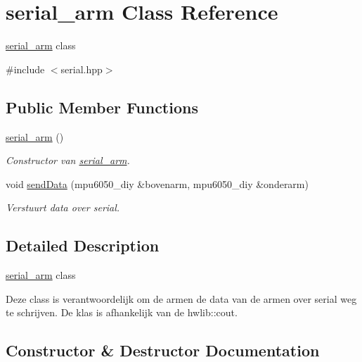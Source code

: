 \hypertarget{classserial__arm}{}\section{serial\+\_\+arm Class Reference}
\label{classserial__arm}


\hyperlink{classserial__arm}{serial\+\_\+arm} class  




{\ttfamily \#include $<$serial.\+hpp$>$}

\subsection*{Public Member Functions}
\begin{DoxyCompactItemize}
\item 
\hyperlink{classserial__arm_a76b11a3db03d8bedf1734976a35038f5}{serial\+\_\+arm} ()
\begin{DoxyCompactList}\small\item\em Constructor van \hyperlink{classserial__arm}{serial\+\_\+arm}. \end{DoxyCompactList}\item 
void \hyperlink{classserial__arm_a61f41ba18be300410cfb730ca649c3e7}{send\+Data} (mpu6050\+\_\+diy \&bovenarm, mpu6050\+\_\+diy \&onderarm)
\begin{DoxyCompactList}\small\item\em Verstuurt data over serial. \end{DoxyCompactList}\end{DoxyCompactItemize}


\subsection{Detailed Description}
\hyperlink{classserial__arm}{serial\+\_\+arm} class 

Deze class is verantwoordelijk om de armen de data van de armen over serial weg te schrijven. De klas is afhankelijk van de hwlib\+::cout. 

\subsection{Constructor \& Destructor Documentation}
\mbox{\label{classserial__arm_a76b11a3db03d8bedf1734976a35038f5}} 
